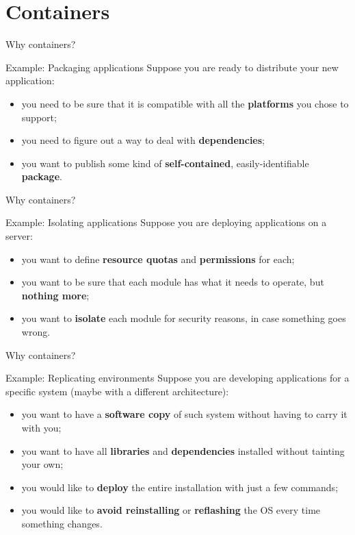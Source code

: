 
\section{Containers}
\graphicspath{{figs/section1/}}

\begin{frame}{Why containers?}
	\begin{exampleblock}{Example: Packaging applications}
    \justifying
		Suppose you are ready to distribute your new application:
		\begin{itemize}
			\item you need to be sure that it is compatible with all the \textbf{platforms} you chose to support;
			\item you need to figure out a way to deal with \textbf{dependencies};
			\item you want to publish some kind of \textbf{self-contained}, easily-identifiable \textbf{package}.
		\end{itemize}
	\end{exampleblock}
\end{frame}
\begin{frame}{Why containers?}
	\begin{exampleblock}{Example: Isolating applications}
    \justifying
		Suppose you are deploying applications on a server:
		\begin{itemize}
			\item you want to define \textbf{resource quotas} and \textbf{permissions} for each;
			\item you want to be sure that each module has what it needs to operate, but \textbf{nothing more};
			\item you want to \textbf{isolate} each module for security reasons, in case something goes wrong.
		\end{itemize}
	\end{exampleblock}
\end{frame}
\begin{frame}{Why containers?}
	\begin{exampleblock}{Example: Replicating environments}
    \justifying
		Suppose you are developing applications for a specific system (maybe with a different architecture):
		\begin{itemize}
			\item you want to have a \textbf{software copy} of such system without having to carry it with you;
			\item you want to have all \textbf{libraries} and \textbf{dependencies} installed without tainting your own;
			\item you would like to \textbf{deploy} the entire installation with just a few commands;
			\item you would like to \textbf{avoid reinstalling} or \textbf{reflashing} the OS every time something changes.
		\end{itemize}
	\end{exampleblock}
\end{frame}
